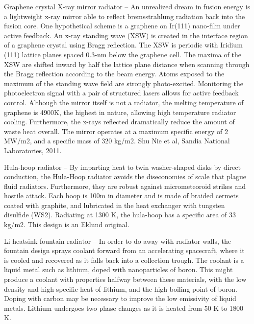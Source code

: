 \documentclass[a4paper]{book}
\begin{document}
Graphene crystal X-ray mirror radiator – An unrealized dream in fusion energy is a lightweight x-ray mirror able to reflect bremsstrahlung radiation back into the fusion core. One hypothetical scheme is a graphene on Ir(111) nano-film under active feedback. An x-ray standing wave (XSW) is created in the interface region of a graphene crystal using Bragg reflection. The XSW is periodic with Iridium (111) lattice planes spaced 0.3-nm below the graphene cell. The maxima of the XSW are shifted inward by half the lattice plane distance when scanning through the Bragg reflection according to the beam energy. Atoms exposed to the maximum of the standing wave field are strongly photo-excited. Monitoring the photoelectron signal with a pair of structured lasers allows for active feedback control. Although the mirror itself is not a radiator, the melting temperature of graphene is 4900K, the highest in nature, allowing high temperature radiator cooling. Furthermore, the x-rays reflected dramatically reduce the amount of waste heat overall. The mirror operates at a maximum specific energy of 2 MW/m2, and a specific mass of 320 kg/m2. Shu Nie et al, Sandia National Laboratories, 2011.

Hula-hoop radiator – By imparting heat to twin washer-shaped disks by direct conduction, the Hula-Hoop radiator avoids the diseconomies of scale that plague fluid radiators. Furthermore, they are robust against micrometeoroid strikes and hostile attack. Each hoop is 100m in diameter and is made of braided cermets coated with graphite, and lubricated in the heat exchanger with tungsten disulfide (WS2). Radiating at 1300 K, the hula-hoop has a specific area of 33 kg/m2.  This design is an Eklund original.
 
Li heatsink fountain radiator – In order to do away with radiator walls, the fountain design sprays coolant forward from an accelerating spacecraft, where it is cooled and recovered as it falls back into a collection trough.  The coolant is a liquid metal such as lithium, doped with nanoparticles of boron. This might produce a coolant with properties halfway between these materials, with the low density and high specific heat of lithium, and the high boiling point of boron. Doping with carbon may be necessary to improve the low emissivity of liquid metals. Lithium undergoes two phase changes as it is heated from 50 K to 1800 K.
 
\end{document}
